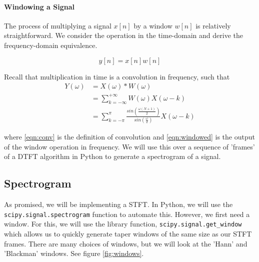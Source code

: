 \documentclass[11pt,a4paper]{article}
\begin{document}
\paragraph{Windowing a Signal} The process of multiplying a signal $x[n]$ by a window $w[n]$ is relatively straightforward. We consider the operation in the time-domain and derive the frequency-domain equivalence.

\begin{equation} \label{eqn:wintime}
y[n] = x[n]w[n]
\end{equation}

Recall that multiplication in time is a convolution in frequency, such that 
\begin{align}
Y(\omega) 	&= X(\omega)*W(\omega) \nonumber \\
			&= \sum_{k=-\infty}^{+\infty} W(\omega)X(\omega-k) \label{eqn:conv} \\
			&= \sum_{k=-\pi}^{\pi} \frac{sin(\frac{\omega(N+1)}{2})}{sin(\frac{\omega}{2})}X(\omega-k) \label{eqn:windowed}
\end{align}

where \eqref{eqn:conv} is the definition of convolution\cite{convolution} and \eqref{eqn:windowed} is the output of the window operation in frequency. We will use this over a sequence of 'frames' of a DTFT algorithm in Python to generate a spectrogram of a signal.

\pagebreak

\subsection{Spectrogram} As promised, we will be implementing a STFT. In Python, we will use the \verb|scipy.signal.spectrogram| function to automate this. However, we first need a window. For this, we will use the library function, \verb|scipy.signal.get_window| which allows us to quickly generate taper windows of the same size as our STFT frames. There are many choices of windows, but we will look at the 'Hann' and 'Blackman' windows. See figure \ref{fig:windows}.
\end{document}
